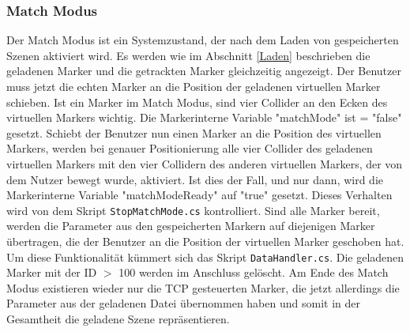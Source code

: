 \subsubsection{Match Modus}
\label{MatchModus}
Der Match Modus ist ein Systemzustand, der nach dem Laden von gespeicherten Szenen aktiviert wird. Es werden wie im Abschnitt \ref{Laden} beschrieben die geladenen Marker und die getrackten Marker gleichzeitig angezeigt. Der Benutzer muss jetzt die echten Marker an die Position der geladenen virtuellen Marker schieben. Ist ein Marker im Match Modus, sind vier Collider an den Ecken des virtuellen Markers wichtig. Die Markerinterne Variable "matchMode" ist = "false" gesetzt. Schiebt der Benutzer nun einen Marker an die Position des virtuellen Markers, werden bei genauer Positionierung alle vier Collider des geladenen virtuellen Markers mit den vier Collidern des anderen virtuellen Markers, der von dem Nutzer bewegt wurde, aktiviert. Ist dies der Fall, und nur dann, wird die Markerinterne Variable "matchModeReady" auf "true" gesetzt. Dieses Verhalten wird von dem Skript \texttt{StopMatchMode.cs} kontrolliert.
Sind alle Marker bereit, werden die Parameter aus den gespeicherten Markern auf diejenigen Marker übertragen, die der Benutzer an die Position der virtuellen Marker geschoben hat. Um diese Funktionalität kümmert sich das Skript \texttt{DataHandler.cs}. 
Die geladenen Marker mit der ID $>$ 100 werden im Anschluss gelöscht. Am Ende des Match Modus existieren wieder nur die TCP gesteuerten Marker, die jetzt allerdings die Parameter aus der geladenen Datei übernommen haben und somit in der Gesamtheit die geladene Szene repräsentieren.

